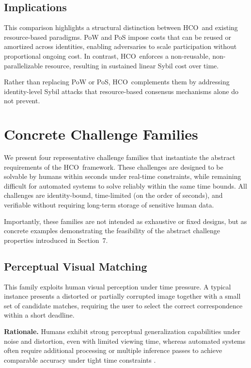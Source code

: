 \documentclass[11pt]{article}
\newcommand{\HCO}{HCO\xspace}
\begin{document}
\subsection{Implications}
\label{subsec:resource-implications}

This comparison highlights a structural distinction between \HCO\ and existing
resource-based paradigms. PoW and PoS impose costs that can be reused or amortized
across identities, enabling adversaries to scale participation without proportional
ongoing cost. In contrast, \HCO\ enforces a non-reusable, non-parallelizable resource,
resulting in sustained linear Sybil cost over time.

Rather than replacing PoW or PoS, \HCO\ complements them by addressing identity-level
Sybil attacks that resource-based consensus mechanisms alone do not prevent.

	
\section{Concrete Challenge Families}

We present four representative challenge families that instantiate the abstract requirements of the \HCO\ framework. These challenges are designed to be solvable by humans within seconds under real-time constraints, while remaining difficult for automated systems to solve reliably within the same time bounds. All challenges are identity-bound, time-limited (on the order of seconds), and verifiable without requiring long-term storage of sensitive human data.

Importantly, these families are not intended as exhaustive or fixed designs, but as concrete examples demonstrating the feasibility of the abstract challenge properties introduced in Section~7.

\subsection{Perceptual Visual Matching}

This family exploits human visual perception under time pressure. A typical instance presents a distorted or partially corrupted image together with a small set of candidate matches, requiring the user to select the correct correspondence within a short deadline.

\textbf{Rationale.}
Humans exhibit strong perceptual generalization capabilities under noise and distortion, even with limited viewing time, whereas automated systems often require additional processing or multiple inference passes to achieve comparable accuracy under tight time constraints \cite{geirhos2018generalisation}.
\end{document}
